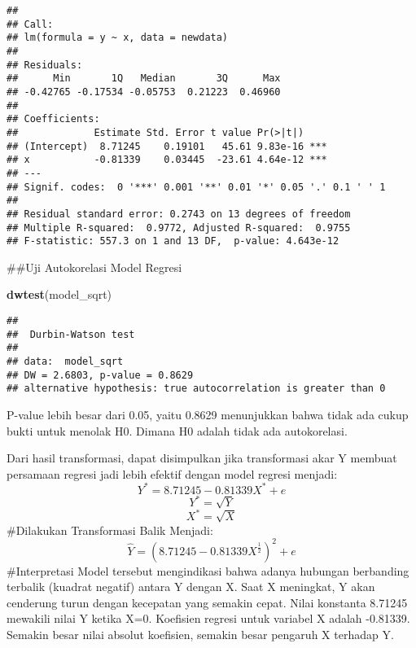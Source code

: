 \documentclass[
]{article}
\newenvironment{Shaded}{\begin{snugshade}}{\end{snugshade}}
\newcommand{\FunctionTok}[1]{\textcolor[rgb]{0.13,0.29,0.53}{\textbf{#1}}}
\newcommand{\NormalTok}[1]{#1}
\begin{document}
\begin{verbatim}
## 
## Call:
## lm(formula = y ~ x, data = newdata)
## 
## Residuals:
##      Min       1Q   Median       3Q      Max 
## -0.42765 -0.17534 -0.05753  0.21223  0.46960 
## 
## Coefficients:
##             Estimate Std. Error t value Pr(>|t|)    
## (Intercept)  8.71245    0.19101   45.61 9.83e-16 ***
## x           -0.81339    0.03445  -23.61 4.64e-12 ***
## ---
## Signif. codes:  0 '***' 0.001 '**' 0.01 '*' 0.05 '.' 0.1 ' ' 1
## 
## Residual standard error: 0.2743 on 13 degrees of freedom
## Multiple R-squared:  0.9772, Adjusted R-squared:  0.9755 
## F-statistic: 557.3 on 1 and 13 DF,  p-value: 4.643e-12
\end{verbatim}

\#\#Uji Autokorelasi Model Regresi

\begin{Shaded}
\begin{Highlighting}[]
\FunctionTok{dwtest}\NormalTok{(model\_sqrt)}
\end{Highlighting}
\end{Shaded}

\begin{verbatim}
## 
##  Durbin-Watson test
## 
## data:  model_sqrt
## DW = 2.6803, p-value = 0.8629
## alternative hypothesis: true autocorrelation is greater than 0
\end{verbatim}

P-value lebih besar dari 0.05, yaitu 0.8629 menunjukkan bahwa tidak ada
cukup bukti untuk menolak H0. Dimana H0 adalah tidak ada autokorelasi.

Dari hasil transformasi, dapat disimpulkan jika transformasi akar Y
membuat persamaan regresi jadi lebih efektif dengan model regresi
menjadi: \[Y^* = 8.71245 - 0.81339X^* + e\] \[Y^* = \sqrt Y\]
\[X^* = \sqrt X\] \#Dilakukan Transformasi Balik Menjadi:
\[\hat Y=(8.71245-0.81339X^\frac12)^2 + e\] \#Interpretasi Model
tersebut mengindikasi bahwa adanya hubungan berbanding terbalik (kuadrat
negatif) antara Y dengan X. Saat X meningkat, Y akan cenderung turun
dengan kecepatan yang semakin cepat. Nilai konstanta 8.71245 mewakili
nilai Y ketika X=0. Koefisien regresi untuk variabel X adalah -0.81339.
Semakin besar nilai absolut koefisien, semakin besar pengaruh X terhadap
Y.
\end{document}
